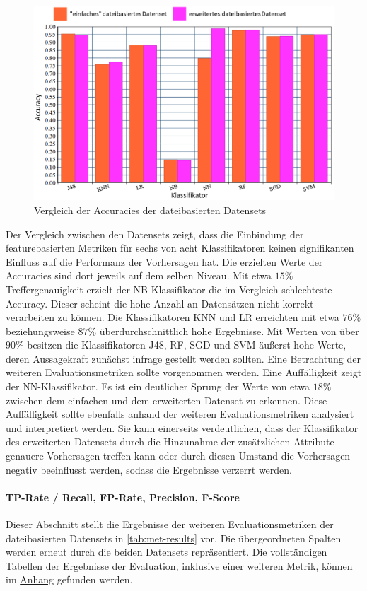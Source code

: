 \begin{figure}[h!t]
    \centering
    \includegraphics[width=\textwidth]{images/final_eval}
    \caption{Vergleich der Accuracies der dateibasierten Datensets\label{fig:final-eval}}
\end{figure}

Der Vergleich zwischen den Datensets zeigt, dass die Einbindung der featurebasierten Metriken für sechs von acht Klassifikatoren keinen signifikanten Einfluss auf die Performanz der Vorhersagen hat. Die erzielten Werte der Accuracies sind dort jeweils auf dem selben Niveau. Mit etwa $15\%$ Treffergenauigkeit erzielt der NB-Klassifikator die im Vergleich schlechteste Accuracy. Dieser scheint die hohe Anzahl an Datensätzen nicht korrekt verarbeiten zu können. Die Klassifikatoren KNN und LR erreichten mit etwa $76\%$ beziehungsweise $87\%$ überdurchschnittlich hohe Ergebnisse. Mit Werten von über $90\%$ besitzen die Klassifikatoren J48, RF, SGD und SVM äußerst hohe Werte, deren Aussagekraft zunächst infrage gestellt werden sollten. Eine Betrachtung der weiteren Evaluationsmetriken sollte vorgenommen werden.
Eine Auffälligkeit zeigt der NN-Klassifikator. Es ist ein deutlicher Sprung der Werte von etwa $18\%$ zwischen dem \glqq einfachen\grqq{} und dem erweiterten Datenset zu erkennen. Diese Auffälligkeit sollte ebenfalls anhand der weiteren Evaluationsmetriken analysiert und interpretiert werden. Sie kann einerseits verdeutlichen, dass der Klassifikator des erweiterten Datensets durch die Hinzunahme der zusätzlichen Attribute genauere Vorhersagen treffen kann oder durch diesen Umstand die Vorhersagen negativ beeinflusst werden, sodass die Ergebnisse verzerrt werden.

\paragraph{TP-Rate / Recall, FP-Rate, Precision, F-Score}
Dieser Abschnitt stellt die Ergebnisse der weiteren Evaluationsmetriken der dateibasierten Datensets in \autoref{tab:met-results} vor. Die übergeordneten Spalten werden erneut durch die beiden Datensets repräsentiert. Die vollständigen Tabellen der Ergebnisse der Evaluation, inklusive einer weiteren Metrik, können im \hyperref[appendix3]{Anhang} gefunden werden.

